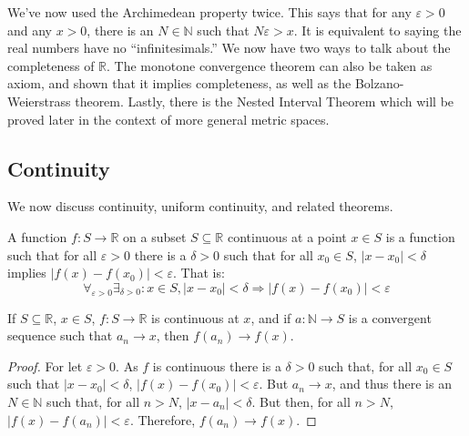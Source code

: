 \documentclass[crop=false,class=book,oneside]{standalone}
\begin{document}
            We've now used the Archimedean property twice. This
            says that for any $\varepsilon>0$ and any
            $x>0$, there is an $N\in\mathbb{N}$ such that
            $N\varepsilon>x$. It is equivalent to saying the
            real numbers have no ``infinitesimals.'' We now
            have two ways to talk about the completeness of
            $\mathbb{R}$. The monotone convergence theorem
            can also be taken as axiom, and shown that it
            implies completeness, as well as the
            Bolzano-Weierstrass theorem. Lastly, there is the
            Nested Interval Theorem which will be proved later
            in the context of more general metric spaces.
        \subsection{Continuity}
            We now discuss continuity, uniform continuity, and
            related theorems.
            \begin{definition}
                A function $f:S\rightarrow\mathbb{R}$
                on a subset $S\subseteq\mathbb{R}$ continuous
                at a point $x\in{S}$ is a function such that
                for all $\varepsilon>0$ there is a $\delta>0$
                such that for all $x_{0}\in{S}$,
                $|x-x_{0}|<\delta$ implies
                $|f(x)-f(x_{0})|<\varepsilon$. That is:
                \begin{equation}
                    \forall_{\varepsilon>0}\exists_{\delta>0}:
                    x\in{S},|x-x_{0}|<\delta
                    \Rightarrow|f(x)-f(x_{0})|<\varepsilon
                \end{equation}
            \end{definition}
            \begin{theorem}
                If $S\subseteq\mathbb{R}$, $x\in{S}$,
                $f:S\rightarrow\mathbb{R}$
                is continuous at $x$, and if
                $a:\mathbb{N}\rightarrow{S}$
                is a convergent sequence such that
                $a_{n}\rightarrow{x}$, then
                $f(a_{n})\rightarrow{f(x)}$.
            \end{theorem}
            \begin{proof}
                For let $\varepsilon>0$. As $f$ is
                continuous there is a $\delta>0$ such that,
                for all $x_{0}\in{S}$
                such that $|x-x_{0}|<\delta$,
                $|f(x)-f(x_{0})|<\varepsilon$.
                But $a_{n}\rightarrow{x}$, and thus there is an
                $N\in\mathbb{N}$ such that, for all $n>N$,
                $|x-a_{n}|<\delta$. But then, for all $n>N$,
                $|f(x)-f(a_{n})|<\varepsilon$. Therefore,
                $f(a_{n})\rightarrow{f(x)}$.
            \end{proof}
\end{document}
